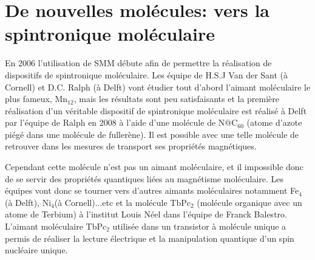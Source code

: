 \section{De nouvelles molécules: vers la spintronique moléculaire}
En 2006 l'utilisation de SMM débute afin de permettre la réalisation de dispositifs de spintronique moléculaire. Les équipe de H.S.J Van der Sant (à Cornell) et D.C. Ralph (à Delft) vont étudier tout d'abord l'aimant moléculaire le plus fameux, Mn$_{12}$, mais les résultats sont peu satisfaisants et la première réalisation d'un véritable dispositif de spintronique moléculaire est réalisé à Delft par l'équipe de Ralph en 2008 à l'aide d'une molécule de N@C$_{60}$ (atome d'azote piégé dans une molécule de fullerène). Il est possible avec une telle molécule de retrouver dans les mesures de transport ses propriétés magnétiques.
\begin{figure}[h]
    \begin{center}
        \caption{}
        \label{fig:}
    \end{center}
\end{figure}
Cependant cette molécule n'est pas un aimant moléculaire, et il impossible donc de se servir des propriétés quantiques liées au magnétisme moléculaire. Les équipes vont donc se tourner vers d'autres aimants moléculaires notamment Fe$_{4}$ (à Delft), Ni$_{4}$(à Cornell)...etc et la molécule TbPc$_{2}$ (molécule organique avec un atome de Terbium) à l'institut Louis Néel dans l'équipe de Franck Balestro. L'aimant moléculaire TbPc$_{2}$ utilisée dans un transistor à molécule unique a permis de réaliser la lecture électrique et la manipulation quantique d'un spin nucléaire unique.
